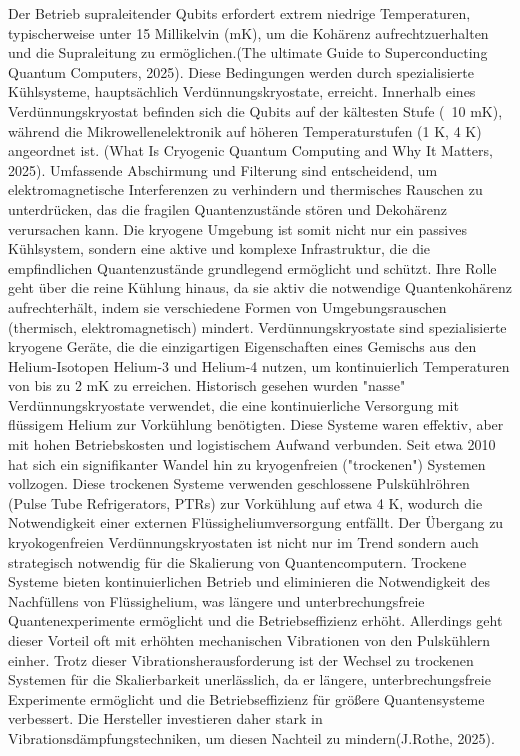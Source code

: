 Der Betrieb supraleitender Qubits erfordert extrem niedrige Temperaturen, typischerweise unter 15 Millikelvin (mK), um die Kohärenz aufrechtzuerhalten und die Supraleitung zu ermöglichen.(The ultimate Guide to Superconducting Quantum Computers, 2025). Diese Bedingungen werden durch spezialisierte Kühlsysteme, hauptsächlich Verdünnungskryostate, erreicht. Innerhalb eines Verdünnungskryostat befinden sich die Qubits auf der kältesten Stufe (~10 mK), während die Mikrowellenelektronik auf höheren Temperaturstufen (1 K, 4 K) angeordnet ist. (What Is Cryogenic Quantum Computing and Why It Matters, 2025). Umfassende Abschirmung und Filterung sind entscheidend, um elektromagnetische Interferenzen zu verhindern und thermisches Rauschen zu unterdrücken, das die fragilen Quantenzustände stören und Dekohärenz verursachen kann. Die kryogene Umgebung ist somit nicht nur ein passives Kühlsystem, sondern eine aktive und komplexe Infrastruktur, die die empfindlichen Quantenzustände grundlegend ermöglicht und schützt. Ihre Rolle geht über die reine Kühlung hinaus, da sie aktiv die notwendige Quantenkohärenz aufrechterhält, indem sie verschiedene Formen von Umgebungsrauschen (thermisch, elektromagnetisch) mindert. Verdünnungskryostate sind spezialisierte kryogene Geräte, die die einzigartigen Eigenschaften eines Gemischs aus den Helium-Isotopen Helium-3 und Helium-4 nutzen, um kontinuierlich Temperaturen von bis zu 2 mK zu erreichen. Historisch gesehen wurden "nasse" Verdünnungskryostate verwendet, die eine kontinuierliche Versorgung mit flüssigem Helium zur Vorkühlung benötigten. Diese Systeme waren effektiv, aber mit hohen Betriebskosten und logistischem Aufwand verbunden. Seit etwa 2010 hat sich ein signifikanter Wandel hin zu kryogenfreien ("trockenen") Systemen vollzogen. Diese trockenen Systeme verwenden geschlossene Pulskühlröhren (Pulse Tube Refrigerators, PTRs) zur Vorkühlung auf etwa 4 K, wodurch die Notwendigkeit einer externen Flüssigheliumversorgung entfällt. Der Übergang zu kryokogenfreien Verdünnungskryostaten ist nicht nur im Trend sondern auch strategisch notwendig für die Skalierung von Quantencomputern. Trockene Systeme bieten kontinuierlichen Betrieb und eliminieren die Notwendigkeit des Nachfüllens von Flüssighelium, was längere und unterbrechungsfreie Quantenexperimente ermöglicht und die Betriebseffizienz erhöht. Allerdings geht dieser Vorteil oft mit erhöhten mechanischen Vibrationen von den Pulskühlern einher. Trotz dieser Vibrationsherausforderung ist der Wechsel zu trockenen Systemen für die Skalierbarkeit unerlässlich, da er längere, unterbrechungsfreie Experimente ermöglicht und die Betriebseffizienz für größere Quantensysteme verbessert. Die Hersteller investieren daher stark in Vibrationsdämpfungstechniken, um diesen Nachteil zu mindern(J.Rothe, 2025).
